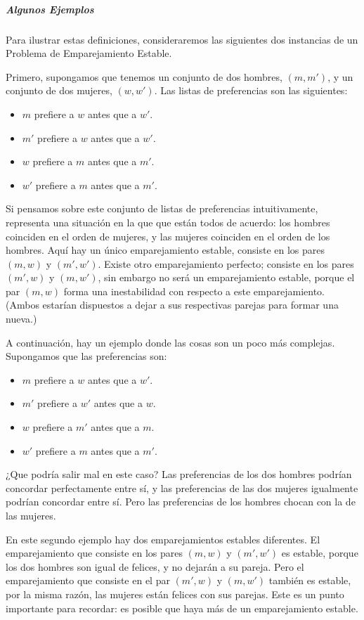 \documentclass[a4paper, 12pt]{book}
\theoremstyle{dotless}
\begin{document}
\subparagraph{Algunos Ejemplos} Para ilustrar estas definiciones, consideraremos las siguientes dos instancias de un Problema de Emparejamiento Estable.

Primero, supongamos que tenemos un conjunto de dos hombres, $(m,m')$, y un conjunto de dos mujeres, $(w, w')$.  Las listas de preferencias son las siguientes:

   \begin{itemize}
      \item $m$ prefiere a $w$ antes que a $w'$.
      \item $m'$ prefiere a $w$ antes que a $w'$.
      \item $w$ prefiere a $m$ antes que a $m'$.
      \item $w'$ prefiere a $m$ antes que a $m'$.
    \end{itemize}
    
Si pensamos sobre este conjunto de listas de preferencias intuitivamente, representa una situación en la que que están todos de acuerdo: los hombres coinciden en el orden de mujeres, y las mujeres coinciden en el orden de los hombres. Aquí hay un único emparejamiento estable, consiste en los pares $(m,w)$ y $(m',w')$. Existe otro emparejamiento perfecto; consiste en los pares $(m',w)$ y $(m,w')$, sin embargo no será un emparejamiento estable, porque el par $(m,w)$ forma una inestabilidad con respecto a este  emparejamiento. (Ambos estarían dispuestos a dejar a sus respectivas parejas para formar una nueva.)

A continuación, hay un ejemplo donde las cosas son un poco más complejas. Supongamos que las preferencias son:

   \begin{itemize}
      \item $m$ prefiere a $w$ antes que a $w'$.
      \item $m'$ prefiere a $w'$ antes que a $w$.
      \item $w$ prefiere a $m'$ antes que a $m$.
      \item $w'$ prefiere a $m$ antes que a $m'$.
    \end{itemize}
    
¿Que podría salir mal en este caso? Las preferencias de los dos hombres podrían concordar perfectamente entre sí, y las preferencias de las dos mujeres igualmente podrían concordar entre sí. Pero las preferencias de los hombres chocan con la de las mujeres. 

En este segundo ejemplo hay dos emparejamientos estables diferentes. El emparejamiento que consiste en los pares $(m, w)$ y $(m',w')$ es estable, porque los dos hombres son igual de felices, y no dejarán a su pareja. Pero el emparejamiento que consiste en el par $(m',w)$ y $(m,w')$ también es estable, por la misma razón, las mujeres están felices con sus parejas. Este es un punto importante para recordar: es posible que haya más de un emparejamiento estable.
\end{document}
